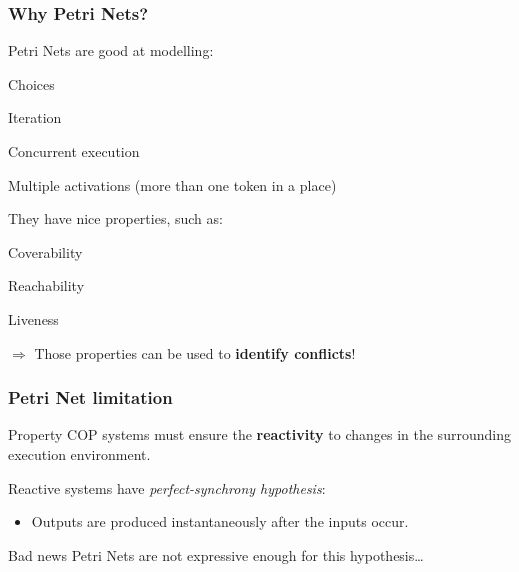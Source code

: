\documentclass{beamer}
\newenvironment{wideitemize}{\itemize\addtolength{\itemsep}{10pt}}{\enditemize}
\begin{document}
\begin{frame}
	\frametitle{Why Petri Nets?}

	\begin{wideitemize}
		\item Petri Nets are good at modelling:

		\begin{wideitemize}
			\item Choices
			\item Iteration
			\item Concurrent execution
			\item Multiple activations (more than one token in a place)
		\end{wideitemize}

		\item They have nice properties, such as:

		\begin{wideitemize}
			\item Coverability
			\item Reachability
			\item Liveness
		\end{wideitemize}
	\end{wideitemize}

	\pause

	$\Rightarrow$ Those properties can be used to \textbf{identify conflicts}!
\end{frame}

\begin{frame}
	\frametitle{Petri Net limitation}

	\begin{exampleblock}{Property}
	COP systems must ensure the \textbf{reactivity} to changes in the surrounding execution environment.
	\end{exampleblock}
	\bigskip

	 Reactive systems have \textit{perfect-synchrony hypothesis}:
	\begin{itemize}
		\item Outputs are produced instantaneously after the inputs occur.
	\end{itemize}

	\bigskip
	\pause
	\begin{alertblock}{Bad news}
		Petri Nets are not expressive enough for this hypothesis\ldots
	\end{alertblock}


\end{frame}
\end{document}
